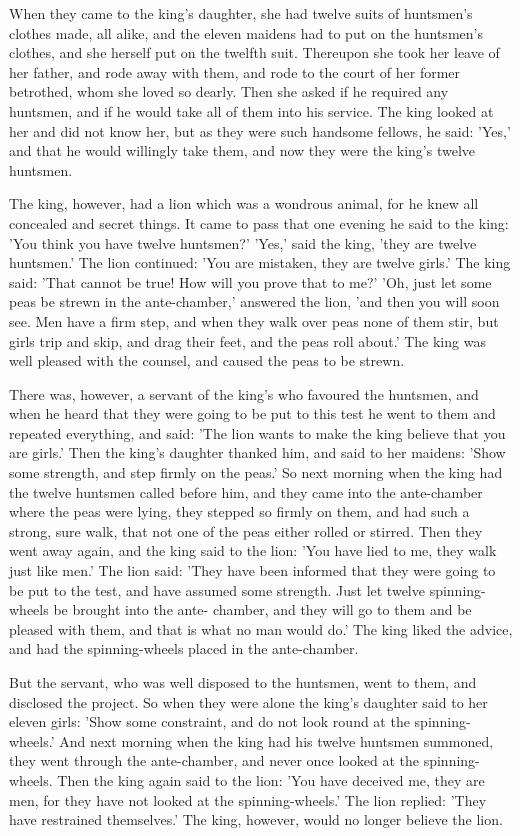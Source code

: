 \documentclass[12pt]{book}
\begin{document}
When they came to the king's daughter, she had twelve suits of
huntsmen's clothes made, all alike, and the eleven maidens had to put
on the huntsmen's clothes, and she herself put on the twelfth suit.
Thereupon she took her leave of her father, and rode away with them,
and rode to the court of her former betrothed, whom she loved so
dearly. Then she asked if he required any huntsmen, and if he would
take all of them into his service. The king looked at her and did not
know her, but as they were such handsome fellows, he said: 'Yes,' and
that he would willingly take them, and now they were the king's twelve
huntsmen.

The king, however, had a lion which was a wondrous animal, for he knew
all concealed and secret things. It came to pass that one evening he
said to the king: 'You think you have twelve huntsmen?' 'Yes,' said
the king, 'they are twelve huntsmen.' The lion continued: 'You are
mistaken, they are twelve girls.' The king said: 'That cannot be true!
How will you prove that to me?' 'Oh, just let some peas be strewn in
the ante-chamber,' answered the lion, 'and then you will soon see.
Men have a firm step, and when they walk over peas none of them stir,
but girls trip and skip, and drag their feet, and the peas roll
about.' The king was well pleased with the counsel, and caused the
peas to be strewn.

There was, however, a servant of the king's who favoured the huntsmen,
and when he heard that they were going to be put to this test he went
to them and repeated everything, and said: 'The lion wants to make the
king believe that you are girls.' Then the king's daughter thanked
him, and said to her maidens: 'Show some strength, and step firmly on
the peas.' So next morning when the king had the twelve huntsmen
called before him, and they came into the ante-chamber where the peas
were lying, they stepped so firmly on them, and had such a strong,
sure walk, that not one of the peas either rolled or stirred. Then
they went away again, and the king said to the lion: 'You have lied to
me, they walk just like men.' The lion said: 'They have been informed
that they were going to be put to the test, and have assumed some
strength. Just let twelve spinning-wheels be brought into the ante-
chamber, and they will go to them and be pleased with them, and that
is what no man would do.' The king liked the advice, and had the
spinning-wheels placed in the ante-chamber.

But the servant, who was well disposed to the huntsmen, went to them,
and disclosed the project. So when they were alone the king's daughter
said to her eleven girls: 'Show some constraint, and do not look round
at the spinning-wheels.' And next morning when the king had his twelve
huntsmen summoned, they went through the ante-chamber, and never once
looked at the spinning-wheels. Then the king again said to the lion:
'You have deceived me, they are men, for they have not looked at the
spinning-wheels.' The lion replied: 'They have restrained themselves.'
The king, however, would no longer believe the lion.
\end{document}

